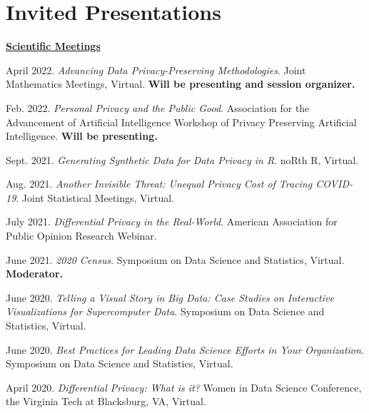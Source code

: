 \documentclass[11pt, letterpaper, roman]{moderncv} %
\begin{document}

\newpage
\section{Invited Presentations}

\underline{\textbf{\large Scientific Meetings}}\normalsize
\vspace{6pt}
\begin{etaremune}[topsep=0pt, itemsep=3pt, partopsep=0pt, parsep=0pt]
    \item April 2022. \textit{Advancing Data Privacy-Preserving Methodologies}. Joint Mathematics Meetings, Virtual. \textbf{Will be presenting and session organizer.}

    \item Feb. 2022. \textit{Personal Privacy and the Public Good}. Association for the Advancement of Artificial Intelligence Workshop of Privacy Preserving Artificial Intelligence. \textbf{Will be presenting.}
    
    \item Sept. 2021. \textit{Generating Synthetic Data for Data Privacy in R}. noRth R, Virtual.

    \item Aug. 2021. \textit{Another Invisible Threat: Unequal Privacy Cost of Tracing COVID-19}. Joint Statistical Meetings, Virtual.
    
    \item July 2021. \textit{Differential Privacy in the Real-World}. American Association for Public Opinion Research Webinar.
    
    \item June 2021. \textit{2020 Census}. Symposium on Data Science and Statistics, Virtual. \textbf{Moderator.}

    \item June 2020. \textit{Telling a Visual Story in Big Data: Case Studies on Interactive Visualizations for Supercomputer Data}. Symposium on Data Science and Statistics, Virtual.
  
    \item June 2020. \textit{Best Practices for Leading Data Science Efforts in Your Organization}. Symposium on Data Science and Statistics, Virtual.
  
    \item April 2020. \textit{Differential Privacy: What is it?} Women in Data Science Conference, the Virginia Tech at Blacksburg, VA, Virtual.


\end{etaremune}
\end{document}
